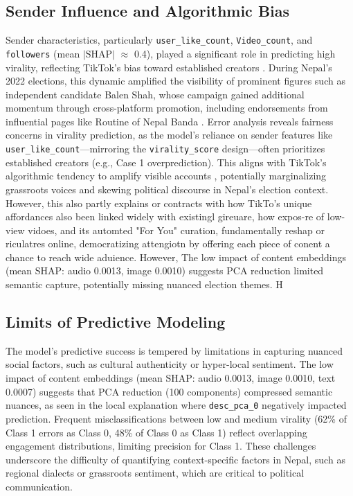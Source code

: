 \documentclass[12pt,a4paper]{report}
\begin{document}
\subsection{Sender Influence and Algorithmic Bias}

Sender characteristics, particularly \texttt{user\_like\_count}, \texttt{Video\_count}, and \texttt{followers} (mean $|\text{SHAP}|$ $\approx$ 0.4), played a significant role in predicting high virality, reflecting TikTok’s bias toward established creators \parencite{bucher2018ifthen}. During Nepal’s 2022 elections, this dynamic amplified the visibility of prominent figures such as independent candidate Balen Shah, whose campaign gained additional momentum through cross-platform promotion, including endorsements from influential pages like Routine of Nepal Banda \parencite{Kandel2024}.
\newpage
Error analysis reveals fairness concerns in virality prediction, as the model’s reliance on sender features like \texttt{user\_like\_count}—mirroring the \texttt{virality\_score} design—often prioritizes established creators (e.g., Case 1 overprediction). This aligns with TikTok’s algorithmic tendency to amplify visible accounts \parencite{noble2018algorithms}, potentially marginalizing grassroots voices and skewing political discourse in Nepal’s election context. However, this also partly explains or contracts with how TikTo's unique affordances also been linked widely with existingl gireuare, how expos-re of low-view vidoes, and its automted "For You" curation, fundamentally reshap or riculatres online, democratizing attengiotn by offering each piece of conent a chance to reach wide aduience\parencite{guinaudeau2022fifteen}. However, The low impact of content embeddings (mean SHAP: audio 0.0013, image 0.0010) suggests PCA reduction limited semantic capture, potentially missing nuanced election themes. H

\subsection{Limits of Predictive Modeling}
The model’s predictive success is tempered by limitations in capturing nuanced social factors, such as cultural authenticity or hyper-local sentiment. The low impact of content embeddings (mean SHAP: audio 0.0013, image 0.0010, text 0.0007) suggests that PCA reduction (100 components) compressed semantic nuances, as seen in the local explanation where \texttt{desc\_pca\_0} negatively impacted prediction. Frequent misclassifications between low and medium virality (62\% of Class 1 errors as Class 0, 48\% of Class 0 as Class 1) reflect overlapping engagement distributions, limiting precision for Class 1. These challenges underscore the difficulty of quantifying context-specific factors in Nepal, such as regional dialects or grassroots sentiment, which are critical to political communication.
\newpage
\end{document}
